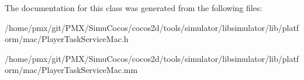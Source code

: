 The documentation for this class was generated from the following files\+:\begin{DoxyCompactItemize}
\item 
/home/pmx/git/\+P\+M\+X/\+Simu\+Cocos/cocos2d/tools/simulator/libsimulator/lib/platform/mac/Player\+Task\+Service\+Mac.\+h\item 
/home/pmx/git/\+P\+M\+X/\+Simu\+Cocos/cocos2d/tools/simulator/libsimulator/lib/platform/mac/Player\+Task\+Service\+Mac.\+mm\end{DoxyCompactItemize}
